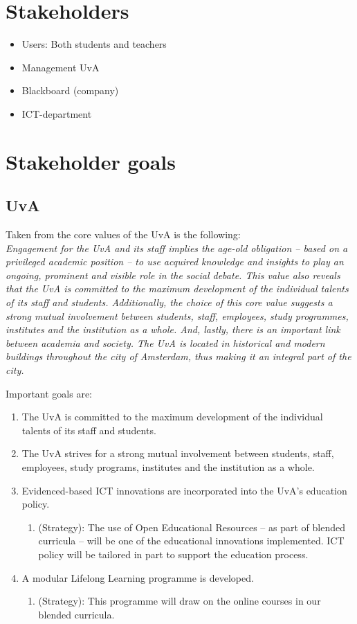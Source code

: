 \section{Stakeholders}
\begin{itemize}
	\item Users: Both students and teachers
	\item Management UvA
	\item Blackboard (company)
	\item ICT-department
\end{itemize}

\section{Stakeholder goals}
\subsection{UvA}
\label{uva_goals}
Taken from the core values of the UvA is the following: \\
\textit{Engagement for the UvA and its staff implies the age-old obligation – based on a privileged academic position – to use acquired knowledge and insights to play an ongoing, prominent and visible role in the social debate. This value also reveals that the UvA is committed to the maximum development of the individual talents of its staff and students. Additionally, the choice of this core value suggests a strong mutual involvement between students, staff, employees, study programmes, institutes and the institution as a whole. And, lastly, there is an important link between academia and society. The UvA is located in historical and modern buildings throughout the city of Amsterdam, thus making it an integral part of the city.}

Important goals are:
\begin{enumerate}
	\item The UvA is committed to the maximum development of the individual talents of its staff and students.\cite{uva_mission}
	\item The UvA strives for a strong mutual involvement between students, staff, employees, study programs, institutes and the institution as a whole.\cite{uva_mission}
	\item Evidenced-based ICT innovations are incorporated into the UvA’s education policy.\cite{uva_strategic_plan} \begin{enumerate}
		\item (Strategy): The use of Open Educational Resources – as part of blended curricula – will be one of the educational innovations implemented. ICT policy will be tailored in part to support the education process. 
	\end{enumerate}
	\item A modular Lifelong Learning programme is developed.\cite{uva_strategic_plan} \begin{enumerate}
		\item (Strategy): This programme will draw on the online
		courses in our blended curricula. 
	\end{enumerate}
\end{enumerate}

